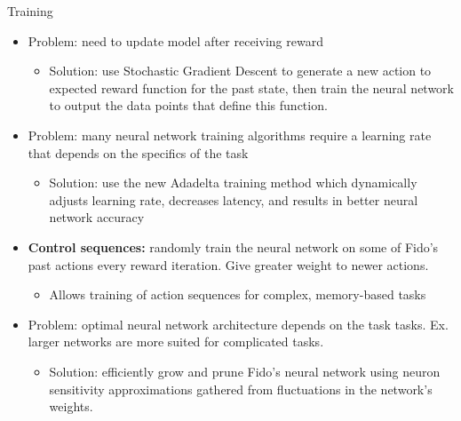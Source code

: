 \documentclass[final]{beamer}
\newlength{\onecolwid}
\newlength{\twocolwid}
\begin{document}
\begin{frame}[t]
\begin{columns}[t]
\begin{column}{\twocolwid}
\begin{columns}[t,totalwidth=\twocolwid]
\begin{column}{\onecolwid}
\begin{block}{Training}
	\begin{itemize}
		\item Problem: need to update model after receiving reward
		\begin{itemize}
			\item Solution: use Stochastic Gradient Descent to generate a new action to expected reward function for the past state, then train the neural network to output the data points that define this function.
		\end{itemize}
		\item Problem: many neural network training algorithms require a learning rate that depends on the specifics of the task
		\begin{itemize}
			\item Solution: use the new Adadelta training method which dynamically adjusts learning rate, decreases latency, and results in better neural network accuracy
		\end{itemize}
		\item \textbf{Control sequences: } randomly train the neural network on some of Fido's past actions every reward iteration. Give greater weight to newer actions.
		\begin{itemize}
			\item Allows training of action sequences for complex, memory-based tasks
		\end{itemize}
		\item Problem: optimal neural network architecture depends on the task tasks. Ex. larger networks are more suited for complicated tasks.
		\begin{itemize}
			\item Solution: efficiently grow and prune Fido's neural network using neuron sensitivity approximations gathered from fluctuations in the network's weights.
		\end{itemize}
	\end{itemize}

\end{block}\end{column}

\end{columns}



\end{column}
\end{columns}
\end{frame}
\end{document}

